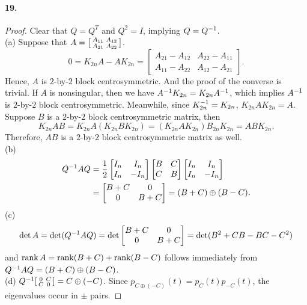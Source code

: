  \paragraph{19.}
  \begin{proof}
    Clear that $Q=Q^T$ and $Q^2 = I$, implying $Q=Q^{-1}$.\\
    (a) Suppose that $A=\begin{bsmallmatrix} A_{11} & A_{12} \\ A_{21} & A_{22}
    \end{bsmallmatrix}$. 
    \[
      0=K_{2n}A - AK_{2n} = 
      \begin{bmatrix}
        A_{21} - A_{12} & A_{22}-A_{11} \\ A_{11}-A_{22} & A_{12} - A_{21}
      \end{bmatrix}.
    \]
    Hence, $A$ is $2$-by-$2$ block centrosymmetric. And the proof of the 
    converse is trivial. If $A$ is nonsingular, then we have $A^{-1} K_{2n}=
    K_{2n}A^{-1}$, which implies $A^{-1}$ is $2$-by-$2$ block centrosymmetric. 
    Meanwhile, since $K_{2n}^{-1} = K_{2n}$, $K_{2n}AK_{2n} = A$. Suppose $B$ is 
    a $2$-by-$2$ block centrosymmetric matrix, then
    \[
      K_{2n}AB = K_{2n}A(K_{2n}BK_{2n}) = (K_{2n}AK_{2n})B_{2n}K_{2n} 
      = ABK_{2n}.
    \]
    Therefore, $AB$ is a $2$-by-$2$ block centrosymmetric matrix as well.\\
    (b)
    \begin{align*}
      Q^{-1} AQ &= \frac{1}{2}
      \begin{bmatrix} I_n & I_n \\ I_n & -I_n \end{bmatrix}
      \begin{bmatrix} B & C \\ C & B \end{bmatrix}
      \begin{bmatrix} I_n & I_n \\ I_n & -I_n \end{bmatrix} \\
      &= \begin{bmatrix} B+C & 0 \\ 0 & B+C \end{bmatrix} 
        = (B+C) \oplus (B-C).
    \end{align*} 
    (c) 
    \[
      \det A = \det(Q^{-1} AQ) = \det\begin{bmatrix}
        B+C & 0 \\ 0 & B+C
      \end{bmatrix} = \det(B^2+CB - BC-C^2)
    \]
    and $\operatorname{rank} A =\operatorname{rank}(B+C)+\operatorname{rank}(B-C)$ follows immediately from $Q^{-1} AQ=
    (B+C)\oplus(B-C)$.\\
    (d) $Q^{-1} \begin{bsmallmatrix} 0 & C \\ C & 0 \end{bsmallmatrix} = C\oplus
    (-C)$. Since $p_{C\oplus(-C)}(t)=p_C(t)p_{-C}(t)$, the eigenvalues occur in 
    $\pm$ pairs.
  \end{proof}

